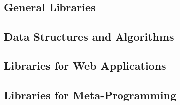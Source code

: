 \documentclass[11pt,fleqn]{article}
\begin{document}
{\subsection{General Libraries}


































\subsection{Data Structures and Algorithms}












\subsection{Libraries for Web Applications}










\subsection{Libraries for Meta-Programming}













} %

\newpage


\end{document}
